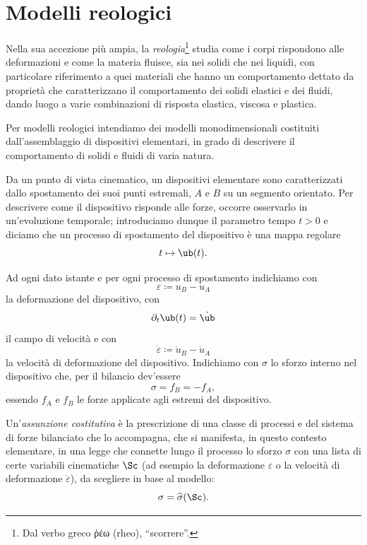 \section{Modelli reologici}
Nella sua accezione più ampia, la \textit{reologia}\footnote{Dal verbo greco \textgreek{ῥέω} (rheo), ``scorrere''.} studia come i corpi rispondono alle deformazioni e come la materia fluisce, sia nei solidi che nei liquidi, con particolare riferimento a quei materiali che hanno un comportamento dettato da proprietà che caratterizzano il comportamento dei solidi elastici e dei fluidi, dando luogo a varie combinazioni di risposta elastica, viscosa e plastica.

Per modelli reologici intendiamo dei modelli monodimensionali costituiti dall'assemblaggio di dispositivi elementari, in grado di descrivere il comportamento di solidi e fluidi di varia natura.

Da un punto di vista cinematico, un dispositivi elementare sono caratterizzati dallo spostamento  dei suoi punti estremali, $A$ e $B$ su un segmento orientato. Per descrivere come il dispositivo risponde alle forze, occorre osservarlo in un'evoluzione temporale; introduciamo dunque il parametro tempo  $t>0$ e diciamo che un processo di spostamento del dispositivo è una mappa regolare
\begin{equation}
t\mapsto \ub(t).
\end{equation}

Ad ogni dato istante e per ogni processo di spostamento indichiamo con
\begin{equation}
\varepsilon\coloneqq u_B-u_A
\end{equation}
la deformazione del dispositivo, con
\begin{equation}
	\partial_t \ub(t)=\dot{\ub}
\end{equation}
il campo di velocità e con
\begin{equation}
	\dot \varepsilon\coloneqq \dot u_B-\dot u_A
\end{equation}
la velocità di deformazione del dispositivo. Indichiamo con $\sigma$ lo sforzo interno nel dispositivo che, per il bilancio dev'essere
\begin{equation}
	\sigma=f_B=-f_A,
\end{equation}
essendo $f_A$ e $f_B$ le forze applicate agli estremi del dispositivo.

Un'\textit{assunzione costitutiva} è la prescrizione di una classe di processi e del sistema di forze bilanciato che lo accompagna, che si manifesta, in questo contesto elementare, in una legge che connette lungo il processo lo sforzo $\sigma$ con una lista di certe variabili cinematiche $\Sc$ (ad esempio la deformazione $\varepsilon$ o la velocità di deformazione $\dot\varepsilon$), da scegliere in base al modello:
\begin{equation}
	\sigma=\widehat{\sigma}(\Sc).
\end{equation}

